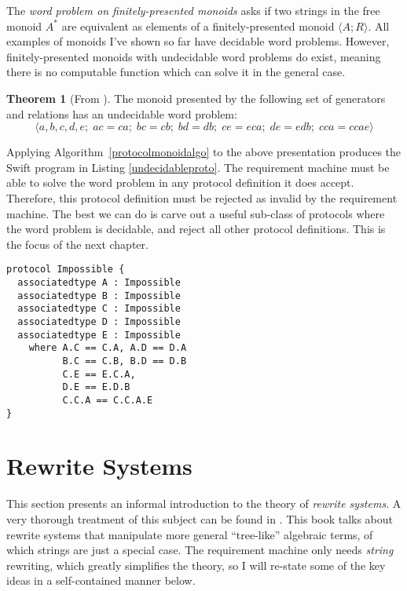 \documentclass[a4paper,headsepline,bibliography=totoc,toc=flat,fleqn,twoside=semi]{scrbook}
\theoremstyle{definition}
\theoremstyle{definition}
\theoremstyle{definition}
\newtheorem{theorem}{Theorem}[chapter]
\begin{document}
The \emph{word problem on finitely-presented monoids} asks if two strings in the free monoid $A^*$ are equivalent as elements of a finitely-presented monoid $\langle A; R\rangle$. All examples of monoids I've shown so far have decidable word problems. However, finitely-presented monoids with undecidable word problems do exist, meaning there is no computable function which can solve it in the general case.
\begin{theorem}[From \cite{undecidablegroup}]\label{undecidablemonoid} The monoid presented by the following set of generators and relations has an undecidable word problem:
\[\langle a, b, c, d, e;\;ac=ca;\;bc=cb;\;bd=db;\;ce=eca;\;de=edb;\;cca=ccae\rangle\]
\end{theorem}
Applying Algorithm~\ref{protocolmonoidalgo} to the above presentation produces the Swift program in Listing \ref{undecidableproto}. The requirement machine must be able to solve the word problem in any protocol definition it does accept. Therefore, this protocol definition must be rejected as invalid by the requirement machine. The best we can do is carve out a useful sub-class of protocols where the word problem is decidable, and reject all other protocol definitions. This is the focus of the next chapter.
\begin{listing}\label{undecidableproto}
\begin{Verbatim}
protocol Impossible {
  associatedtype A : Impossible
  associatedtype B : Impossible
  associatedtype C : Impossible
  associatedtype D : Impossible
  associatedtype E : Impossible
    where A.C == C.A, A.D == D.A
          B.C == C.B, B.D == D.B
          C.E == E.C.A,
          D.E == E.D.B
          C.C.A == C.C.A.E
}
\end{Verbatim}
\end{listing}

\chapter{Rewrite Systems}\label{rewritesystemintro}

This section presents an informal introduction to the theory of \emph{rewrite systems}. A very thorough treatment of this subject can be found in \cite{andallthat}. This book talks about rewrite systems that manipulate more general ``tree-like'' algebraic terms, of which strings are just a special case. The requirement machine only needs \emph{string} rewriting, which greatly simplifies the theory, so I will re-state some of the key ideas in a self-contained manner below.
\end{document}
